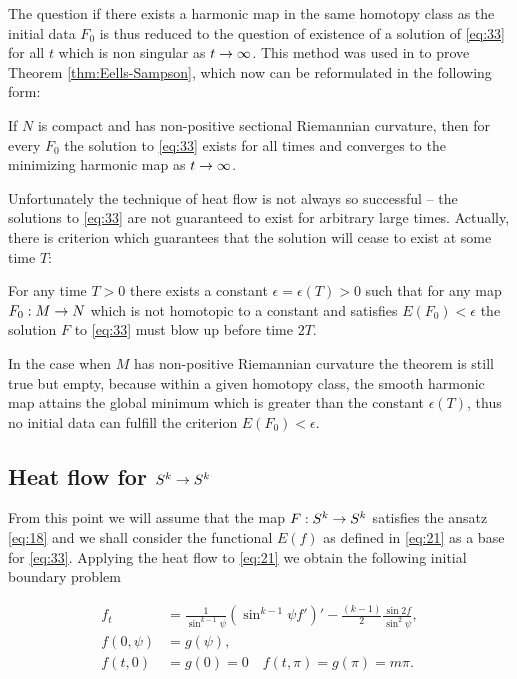 The question if there exists a harmonic map in the same homotopy class
as the initial data $F_0$ is thus reduced to the question of existence
of a solution of \eqref{eq:33} for all $t$ which is non singular as
$t\rightarrow\infty$. This method was used in \cite{Eells1964} to prove
Theorem \ref{thm:Eells-Sampson}, which now can be reformulated in the
following form:

\begin{theorem}\label{thm:Eells-Sampson2}
  If $N$ is compact and has non-positive sectional Riemannian
  curvature, then for every $F_0$ the solution to \eqref{eq:33} exists
  for all times and converges to the minimizing harmonic map as
  $t\rightarrow\infty$.
\end{theorem}

Unfortunately the technique of heat flow is not always so successful
-- the solutions to \eqref{eq:33} are not guaranteed to exist for
arbitrary large times. Actually, there is criterion which guarantees
that the solution will cease to exist at some time $T$:

\begin{theorem}\label{thm:Struwe}
  For any time $T>0$ there exists a constant $\epsilon=\epsilon(T)>0$
  such that for any map $F_0:M\rightarrow N$ which is not homotopic to a
  constant and satisfies $E(F_0)<\epsilon$ the solution $F$ to
  \eqref{eq:33} must blow up before time $2T$.
\end{theorem}

In the case when $M$ has non-positive Riemannian curvature the theorem
is still true but empty, because within a given homotopy class, the
smooth harmonic map attains the global minimum which is greater than
the constant $\epsilon(T)$, thus no initial data can fulfill the
criterion $E(F_0)<\epsilon$.

\subsection{Heat flow for $S^k\rightarrow S^k$}
\label{sec:gradient-flow-skra}

From this point we will assume that the map $F:S^k\rightarrow S^k$ satisfies
the ansatz \eqref{eq:18} and we shall consider the functional $E(f)$
as defined in \eqref{eq:21} as a base for \eqref{eq:33}. Applying the
heat flow to \eqref{eq:21} we obtain the following initial
boundary problem

\begin{equation}
  \label{eq:en_flow}
  \begin{split}
    f_t&=\frac{1}{\sin^{k-1}\psi}\left(\sin^{k-1}\psi
      f'\right)'-\frac{(k-1)}{2}\frac{\sin2f}{\sin^2\psi},\\
    f(0,\psi)&=g(\psi),\\
    f(t,0)&=g(0)=0\quad f(t,\pi)=g(\pi)=m\pi.
  \end{split}
\end{equation}

